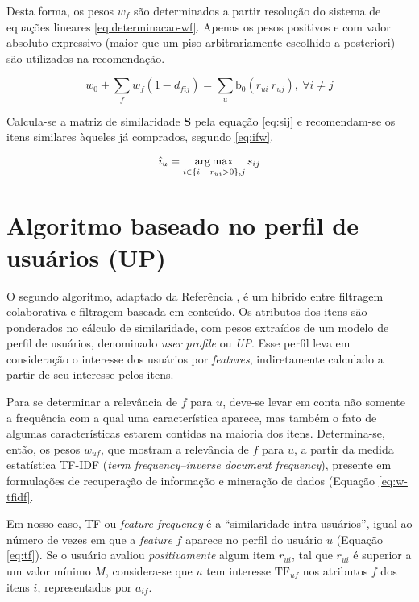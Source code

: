 Desta forma, os pesos $w_f$ são determinados a partir resolução do sistema de equações lineares \ref{eq:determinacao-wf}. Apenas os pesos positivos e com valor absoluto expressivo (maior que um piso arbitrariamente escolhido a posteriori) são utilizados na recomendação. 

\begin{equation}
\label{eq:determinacao-wf} 
    w_0 + \sum_{f}{w_{f}  \left(1-d_{fij}\right)} = \sum_{u}{\mathrm{b_0}\left(r_{ui} ~ r_{uj}\right)},~\forall i \neq j 
\end{equation} 

Calcula-se a matriz de similaridade $\mathbf{S}$ pela equação \ref{eq:sij} e recomendam-se os itens similares àqueles já comprados, segundo \ref{eq:ifw}.

\begin{equation}
\label{eq:ifw} 
    \hat{\imath}_u = \operatorname*{arg\,max}_{i \in \left\{i~|~r_{ui} > 0\right\}, j}{s_{ij}}
\end{equation} 



\section{Algoritmo baseado no perfil de usuários (UP)} %
\label{sec:algoritmo_baseado_no_perfil_de_usu_rios_}


O segundo algoritmo, adaptado da Referência , é um hibrido entre filtragem colaborativa e filtragem baseada em conteúdo. Os atributos dos itens são ponderados no cálculo de similaridade, com pesos extraídos de um modelo de perfil de usuários, denominado \textit{user profile} ou \textit{UP}. Esse perfil leva em consideração o interesse dos usuários por \textit{features}, indiretamente calculado a partir de seu interesse pelos itens. 

Para se determinar a relevância de $f$ para $u$, deve-se levar em conta não somente a frequência com a qual uma característica aparece, mas também o fato de algumas características estarem contidas na maioria dos itens. Determina-se, então, os pesos $w_{uf}$, que mostram a relevância de $f$ para $u$, a partir da medida estatística TF-IDF (\textit{term frequency--inverse document frequency}), presente em formulações de recuperação de informação e mineração de dados (Equação \ref{eq:w-tfidf}. 

Em nosso caso, TF ou \textit{feature frequency} é a ``similaridade intra-usuários'', igual ao número de vezes em que a \textit{feature} $f$ aparece no perfil do usuário $u$ (Equação \ref{eq:tf}). Se o usuário avaliou \textit{positivamente} algum item $r_{ui}$, tal que $r_{ui}$ é superior a um valor mínimo $M$, considera-se que $u$ tem interesse $\mathrm{TF}_{uf}$ nos atributos $f$ dos itens $i$, representados por $a_{if}$. 

